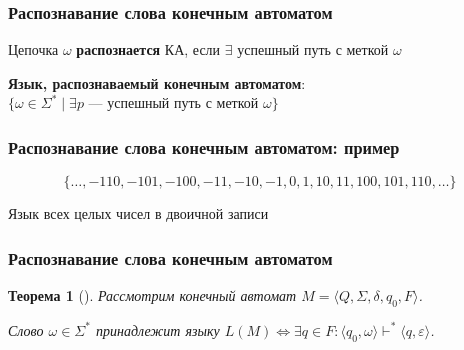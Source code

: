 \documentclass{beamer}
\newtheorem{rutheorem}{Теорема}
\def\iff{\Leftrightarrow}
\begin{document}
\begin{frame}[fragile]
  \transwipe[direction=90]
  \frametitle{Распознавание слова конечным автоматом}

\begin{center}
  Цепочка $\omega$ \textbf{распознается} КА, если $\exists$ успешный путь с меткой $\omega$
\end{center}
    
\vspace{20pt}

\begin{center}
  \textbf{Язык, распознаваемый конечным автоматом}: \\ $\{ \omega \in \Sigma^* \mid \exists p$ --- успешный путь с меткой $\omega \}$
\end{center} 
\end{frame}

\begin{frame}[fragile]
  \transwipe[direction=90]
  \frametitle{Распознавание слова конечным автоматом: пример}

\[ \{ \dots, -110, -101, -100, -11, -10, -1, 0, 1, 10, 11, 100, 101, 110, \dots\} \]

\begin{center}
  Язык всех целых чисел в двоичной записи
\end{center}

  \begin{center}
  \end{center}
\end{frame}


\begin{frame}[fragile]
  \transwipe[direction=90]
  \frametitle{Распознавание слова конечным автоматом}
  \begin{rutheorem}[]
   Рассмотрим конечный автомат  $M = \langle Q , \Sigma , \delta , q_0 , F \rangle$. 

   Слово $\omega \in \Sigma ^*$ принадлежит языку $L(M) \iff \exists q \in F: \langle q_0 , \omega \rangle \vdash^* \langle q , \varepsilon \rangle$.
  \end{rutheorem}  
\end{frame} 
  
\end{document}

